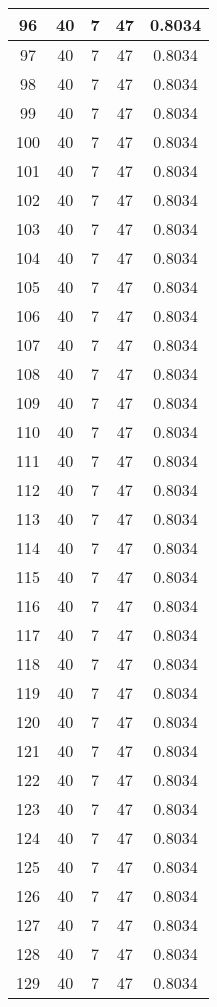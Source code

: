 \documentclass[letterpaper, 12pt]{article}
\begin{document}
\begin{longtable}{|c|c|c|c|c|}
\hline
96 & 40 & 7 & 47 & 0.8034 \\
\hline
97 & 40 & 7 & 47 & 0.8034 \\
\hline
98 & 40 & 7 & 47 & 0.8034 \\
\hline
99 & 40 & 7 & 47 & 0.8034 \\
\hline
100 & 40 & 7 & 47 & 0.8034 \\
\hline
101 & 40 & 7 & 47 & 0.8034 \\
\hline
102 & 40 & 7 & 47 & 0.8034 \\
\hline
103 & 40 & 7 & 47 & 0.8034 \\
\hline
104 & 40 & 7 & 47 & 0.8034 \\
\hline
105 & 40 & 7 & 47 & 0.8034 \\
\hline
106 & 40 & 7 & 47 & 0.8034 \\
\hline
107 & 40 & 7 & 47 & 0.8034 \\
\hline
108 & 40 & 7 & 47 & 0.8034 \\
\hline
109 & 40 & 7 & 47 & 0.8034 \\
\hline
110 & 40 & 7 & 47 & 0.8034 \\
\hline
111 & 40 & 7 & 47 & 0.8034 \\
\hline
112 & 40 & 7 & 47 & 0.8034 \\
\hline
113 & 40 & 7 & 47 & 0.8034 \\
\hline
114 & 40 & 7 & 47 & 0.8034 \\
\hline
115 & 40 & 7 & 47 & 0.8034 \\
\hline
116 & 40 & 7 & 47 & 0.8034 \\
\hline
117 & 40 & 7 & 47 & 0.8034 \\
\hline
118 & 40 & 7 & 47 & 0.8034 \\
\hline
119 & 40 & 7 & 47 & 0.8034 \\
\hline
120 & 40 & 7 & 47 & 0.8034 \\
\hline
121 & 40 & 7 & 47 & 0.8034 \\
\hline
122 & 40 & 7 & 47 & 0.8034 \\
\hline
123 & 40 & 7 & 47 & 0.8034 \\
\hline
124 & 40 & 7 & 47 & 0.8034 \\
\hline
125 & 40 & 7 & 47 & 0.8034 \\
\hline
126 & 40 & 7 & 47 & 0.8034 \\
\hline
127 & 40 & 7 & 47 & 0.8034 \\
\hline
128 & 40 & 7 & 47 & 0.8034 \\
\hline
129 & 40 & 7 & 47 & 0.8034 \\

\end{longtable}
\end{document}
